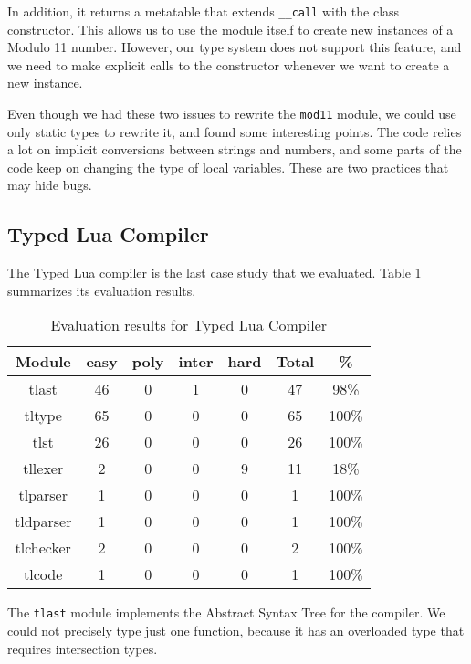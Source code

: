 In addition, it returns a metatable that extends \texttt{\string_\string_call}
with the class constructor.
This allows us to use the module itself to create new instances of a
Modulo 11 number.
However, our type system does not support this feature, and we need to
make explicit calls to the constructor whenever we want to create a
new instance.

Even though we had these two issues to rewrite the \texttt{mod11} module,
we could use only static types to rewrite it, and found some interesting
points.
The code relies a lot on implicit conversions between strings and numbers,
and some parts of the code keep on changing the type of local variables.
These are two practices that may hide bugs.

\subsection{Typed Lua Compiler}

The Typed Lua compiler is the last case study that we evaluated.
Table \ref{tab:evaltlc} summarizes its evaluation results.

\begin{table}[!ht]
\begin{center}
\begin{tabular}{|c|c|c|c|c|c|c|}
\hline
\textbf{Module} & \textbf{easy} & \textbf{poly} & \textbf{inter} & \textbf{hard} & \textbf{Total} & \textbf{\%} \\
\hline
tlast & 46 & 0 & 1 & 0 & 47 & 98\% \\
\hline
tltype & 65 & 0 & 0 & 0 & 65 & 100\% \\
\hline
tlst & 26 & 0 & 0 & 0 & 26 & 100\% \\
\hline
tllexer & 2 & 0 & 0 & 9 & 11 & 18\% \\
\hline
tlparser & 1 & 0 & 0 & 0 & 1 & 100\% \\
\hline
tldparser & 1 & 0 & 0 & 0 & 1 & 100\% \\
\hline
tlchecker & 2 & 0 & 0 & 0 & 2 & 100\% \\
\hline
tlcode & 1 & 0 & 0 & 0 & 1 & 100\% \\
\hline
\end{tabular}
\end{center}
\caption{Evaluation results for Typed Lua Compiler}
\label{tab:evaltlc}
\end{table}

The \texttt{tlast} module implements the Abstract Syntax Tree for
the compiler.
We could not precisely type just one function, because it has
an overloaded type that requires intersection types.

